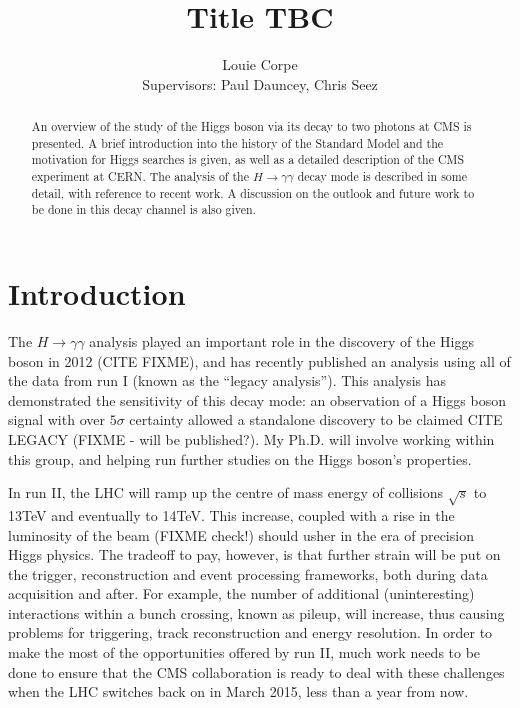 \documentclass[10pt]{article}
\title{Title TBC}
\author{Louie Corpe \\Supervisors: Paul Dauncey, Chris Seez }
\begin{document}
\maketitle

\renewcommand{\abstractname}{Abstract}
\begin{abstract}
{
An overview of the study of the Higgs boson via its decay to two photons at CMS is presented. A brief introduction into the history of the Standard Model and the motivation for Higgs searches is given, as well as a detailed description of the CMS experiment at CERN. The analysis of the $H \rightarrow \gamma\gamma$ decay mode is described in some detail, with reference to recent work. A discussion on the outlook and future work to be done in this decay channel is also given.}
\end{abstract}



\tableofcontents

\newpage 
\section{Introduction}

The $H \rightarrow \gamma \gamma$ analysis played an important role in the discovery of the Higgs boson in 2012 (CITE FIXME), and has recently published an analysis using all of the data from run I (known as the ``legacy analysis''). This analysis has demonstrated the sensitivity of this decay mode: an observation of a Higgs boson signal with over $5 \sigma$ certainty allowed a standalone discovery to be claimed CITE LEGACY (FIXME - will be published?). My Ph.D. will involve working within this group, and helping run further studies on the Higgs boson's properties. 

In run II, the LHC will ramp up the centre of mass energy of collisions $\sqrt{s}$ to 13TeV and eventually to 14TeV. This increase, coupled with a rise in the luminosity of the beam (FIXME check!) should usher in the era of precision Higgs physics. The tradeoff to pay, however, is that further strain will be put on the trigger, reconstruction and event processing frameworks, both during data acquisition and after. For example, the number of additional (uninteresting) interactions within a bunch crossing, known as pileup, will increase, thus causing problems for triggering, track reconstruction and energy resolution. In order to make the most of the opportunities offered by run II, much work needs to be done to ensure that the CMS collaboration is ready to deal with these challenges when the LHC switches back on in March 2015, less than a year from now.
\end{document}
